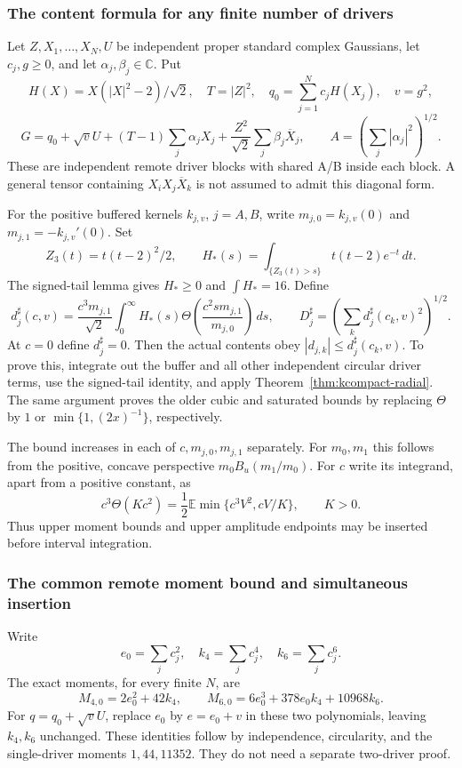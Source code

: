\subsubsection{The content formula for any finite number of drivers}
Let $Z,X_1,\ldots,X_N,U$ be independent proper standard complex
Gaussians, let $c_j,g\ge0$, and let $\alpha_j,\beta_j\in\mathbb C$.
Put
\[
 H(X)=X(|X|^2-2)/\sqrt2,\quad T=|Z|^2,\quad
 q_0=\sum_{j=1}^N c_jH(X_j),\quad v=g^2,
\]
\[
 G=q_0+\sqrt vU+(T-1)\sum_j\alpha_jX_j+
       \frac{Z^2}{\sqrt2}\sum_j\beta_j\overline X_j,\qquad
 A=\left(\sum_j|\alpha_j|^2\right)^{1/2}.
\]
These are independent remote driver blocks with shared A/B inside each
block. A general tensor containing $X_iX_j\overline X_k$ is not assumed
to admit this diagonal form.

For the positive buffered kernels $k_{j,v}$, $j=A,B$, write
$m_{j,0}=k_{j,v}(0)$ and $m_{j,1}=-k_{j,v}'(0)$. Set
\[
 Z_3(t)=t(t-2)^2/2,\qquad
 H_*(s)=\int_{\{Z_3(t)>s\}}t(t-2)e^{-t}\,dt.
\]
The signed-tail lemma gives $H_*\ge0$ and $\int H_*=16$.
Define
\[
 d_j^\sharp(c,v)=\frac{c^3m_{j,1}}{\sqrt2}
       \int_0^\infty H_*(s)
       \Theta\!\left(\frac{c^2s m_{j,1}}{m_{j,0}}\right)\,ds,
 \qquad D_j^\sharp=\left(\sum_kd_j^\sharp(c_k,v)^2\right)^{1/2}.
\]
At $c=0$ define $d_j^\sharp=0$.
Then the actual contents obey $|d_{j,k}|\le d_j^\sharp(c_k,v)$.
To prove this, integrate out the buffer and all other independent
circular driver terms, use the signed-tail identity, and apply
Theorem~\ref{thm:kcompact-radial}. The same argument proves the
older cubic and saturated bounds by replacing $\Theta$ by $1$ or
$\min\{1,(2x)^{-1}\}$, respectively.

The bound increases in each of $c,m_{j,0},m_{j,1}$ separately.
For $m_0,m_1$ this follows from the positive, concave perspective
$m_0B_u(m_1/m_0)$. For $c$ write its integrand, apart from a positive
constant, as
\[
 c^3\Theta(Kc^2)
 =\frac12\mathbb E\min\{c^3V^2,cV/K\},
 \qquad K>0.
\]
Thus upper moment bounds and upper amplitude endpoints may be inserted
before interval integration.

\subsubsection{The common remote moment bound and simultaneous insertion}
Write
\[
 e_0=\sum_jc_j^2,\quad k_4=\sum_jc_j^4,\quad k_6=\sum_jc_j^6.
\]
The exact moments, for every finite $N$, are
\[
 M_{4,0}=2e_0^2+42k_4,\qquad
 M_{6,0}=6e_0^3+378e_0k_4+10968k_6.
\]
For $q=q_0+\sqrt vU$, replace $e_0$ by $e=e_0+v$ in these two
polynomials, leaving $k_4,k_6$ unchanged. These identities follow
by independence, circularity, and the single-driver moments
$1,44,11352$. They do not need a separate two-driver proof.

